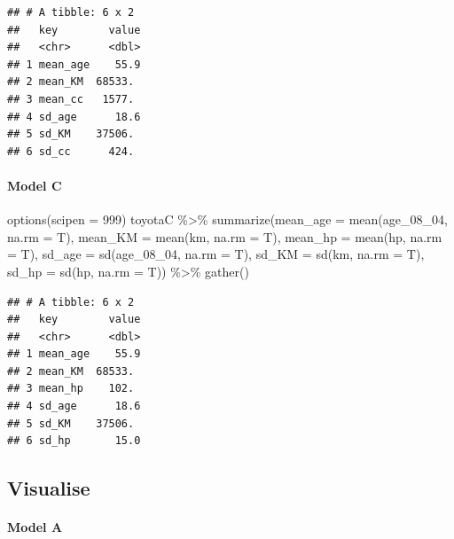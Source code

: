 \documentclass[
]{article}
\newenvironment{Shaded}{\begin{snugshade}}{\end{snugshade}}
\newcommand{\AttributeTok}[1]{\textcolor[rgb]{0.77,0.63,0.00}{#1}}
\newcommand{\DecValTok}[1]{\textcolor[rgb]{0.00,0.00,0.81}{#1}}
\newcommand{\FunctionTok}[1]{\textcolor[rgb]{0.00,0.00,0.00}{#1}}
\newcommand{\NormalTok}[1]{#1}
\newcommand{\SpecialCharTok}[1]{\textcolor[rgb]{0.00,0.00,0.00}{#1}}
\begin{document}
\begin{verbatim}
## # A tibble: 6 x 2
##   key        value
##   <chr>      <dbl>
## 1 mean_age    55.9
## 2 mean_KM  68533. 
## 3 mean_cc   1577. 
## 4 sd_age      18.6
## 5 sd_KM    37506. 
## 6 sd_cc      424.
\end{verbatim}

\hypertarget{model-c-4}{%
\paragraph{Model C}\label{model-c-4}}

\begin{Shaded}
\begin{Highlighting}[]
\FunctionTok{options}\NormalTok{(}\AttributeTok{scipen =} \DecValTok{999}\NormalTok{) }
\NormalTok{toyotaC }\SpecialCharTok{\%\textgreater{}\%} \FunctionTok{summarize}\NormalTok{(}\AttributeTok{mean\_age =} \FunctionTok{mean}\NormalTok{(age\_08\_04, }\AttributeTok{na.rm =}\NormalTok{ T),}
                      \AttributeTok{mean\_KM =} \FunctionTok{mean}\NormalTok{(km, }\AttributeTok{na.rm =}\NormalTok{ T),}
                      \AttributeTok{mean\_hp =} \FunctionTok{mean}\NormalTok{(hp, }\AttributeTok{na.rm =}\NormalTok{ T),}
                      \AttributeTok{sd\_age =} \FunctionTok{sd}\NormalTok{(age\_08\_04, }\AttributeTok{na.rm =}\NormalTok{ T),}
                      \AttributeTok{sd\_KM =} \FunctionTok{sd}\NormalTok{(km, }\AttributeTok{na.rm =}\NormalTok{ T),}
                      \AttributeTok{sd\_hp =} \FunctionTok{sd}\NormalTok{(hp, }\AttributeTok{na.rm =}\NormalTok{ T)) }\SpecialCharTok{\%\textgreater{}\%} 
  \FunctionTok{gather}\NormalTok{()}
\end{Highlighting}
\end{Shaded}

\begin{verbatim}
## # A tibble: 6 x 2
##   key        value
##   <chr>      <dbl>
## 1 mean_age    55.9
## 2 mean_KM  68533. 
## 3 mean_hp    102. 
## 4 sd_age      18.6
## 5 sd_KM    37506. 
## 6 sd_hp       15.0
\end{verbatim}

\hypertarget{visualise}{%
\subsection{Visualise}\label{visualise}}

\hypertarget{model-a-6}{%
\paragraph{Model A}\label{model-a-6}}
\end{document}
